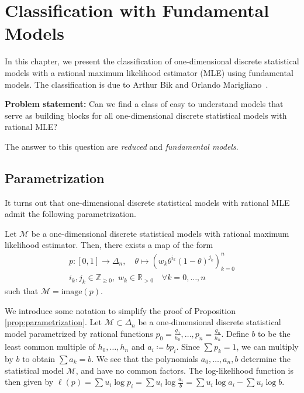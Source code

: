 \chapter{Classification with Fundamental Models}

In this chapter, we present the classification of one-dimensional discrete statistical models with a rational maximum likelihood estimator (MLE) using fundamental models. The classification is due to Arthur Bik and Orlando Marigliano~\cite{bik2022classifying}. 

\begin{center}
    \textbf{Problem statement:} Can we find a class of easy to understand models that serve as building blocks for all one-dimensional discrete statistical models with rational MLE?
\end{center}
The answer to this question are \emph{reduced} and \emph{fundamental models}.

\section{Parametrization}

It turns out that one-dimensional discrete statistical models with rational MLE admit the following parametrization.

\begin{proposition}\label{prop:parametrization}
    Let \( \mathcal{M} \) be a one-dimensional discrete statistical models with rational maximum likelihood estimator. Then, there exists a map of the form
    \begin{gather*}
        p: [0,1] \to \Delta_n, \quad \theta \mapsto (w_k \theta^{i_k} (1-\theta)^{j_k})_{k=0}^n \\
        i_k, j_k \in \mathbb{Z}_{\geq 0}, \;  w_k \in \mathbb{R}_{> 0} \quad \forall k = 0, \dots, n
    \end{gather*}
    such that \( \mathcal{M} = \mathrm{image}(p) \).
\end{proposition}

We introduce some notation to simplify the proof of Proposition \ref{prop:parametrization}.
Let \( \mathcal{M} \subset \Delta_n \) be a one-dimensional discrete statistical model parametrized by rational functions \( p_0 =  \frac{g_0}{h_0}, \dots, p_n =  \frac{g_n}{h_n} \). Define \( b \) to be the least common multiple of \( h_0, \dots, h_n \) and \( a_i \coloneqq b p_i \). Since \( \sum p_k = 1 \), we can multiply by \( b \) to obtain \( \sum a_k = b \). We see that the polynomials \( a_0, \dots, a_n, b \) determine the statistical model \( \mathcal{M} \), and have no common factors. The log-likelihood function is then given by
\( \ell(p) = \sum u_i \log p_i = \sum u_i \log \frac{a_i}{b} = \sum u_i \log a_i - \sum u_i \log b \).

